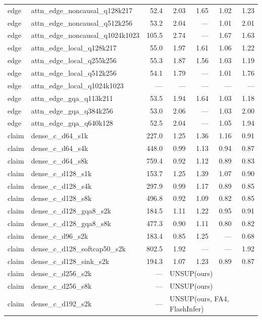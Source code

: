 \begin{longtable}{@{}llrrrrr@{}}
edge & attn\_edge\_noncausal\_q128k217 & 52.4 & 2.03 & 1.65 & 1.02 & 1.23 \\
edge & attn\_edge\_noncausal\_q512k256 & 53.2 & 2.04 & --- & 1.01 & 2.01 \\
edge & attn\_edge\_noncausal\_q1024k1023 & 105.5 & 2.74 & --- & 1.67 & 1.63 \\
edge & attn\_edge\_local\_q128k217 & 55.0 & 1.97 & 1.61 & 1.06 & 1.22 \\
edge & attn\_edge\_local\_q255k256 & 55.3 & 1.87 & 1.56 & 1.03 & 1.19 \\
edge & attn\_edge\_local\_q512k256 & 54.1 & 1.79 & --- & 1.01 & 1.76 \\
edge & attn\_edge\_local\_q1024k1023 & --- & --- & --- & --- & --- \\
edge & attn\_edge\_gqa\_q113k211 & 53.5 & 1.94 & 1.64 & 1.03 & 1.18 \\
edge & attn\_edge\_gqa\_q384k256 & 53.0 & 2.06 & --- & 1.03 & 2.00 \\
edge & attn\_edge\_gqa\_q640k128 & 52.5 & 2.04 & --- & 1.05 & 1.94 \\
claim & dense\_c\_d64\_s1k & 227.0 & 1.25 & 1.36 & 1.16 & 0.91 \\
claim & dense\_c\_d64\_s4k & 448.0 & 0.99 & 1.13 & 0.94 & 0.87 \\
claim & dense\_c\_d64\_s8k & 759.4 & 0.92 & 1.12 & 0.89 & 0.83 \\
claim & dense\_c\_d128\_s1k & 153.7 & 1.25 & 1.39 & 1.07 & 0.90 \\
claim & dense\_c\_d128\_s4k & 297.9 & 0.99 & 1.17 & 0.89 & 0.85 \\
claim & dense\_c\_d128\_s8k & 496.8 & 0.92 & 1.09 & 0.82 & 0.85 \\
claim & dense\_c\_d128\_gqa8\_s2k & 184.5 & 1.11 & 1.22 & 0.95 & 0.91 \\
claim & dense\_c\_d128\_gqa8\_s8k & 477.3 & 0.90 & 1.11 & 0.80 & 0.82 \\
claim & dense\_c\_d96\_s2k & 183.4 & 0.85 & 1.25 & --- & 0.68 \\
claim & dense\_c\_d128\_softcap50\_s2k & 802.5 & 1.92 & --- & --- & 1.92 \\
claim & dense\_c\_d128\_sink\_s2k & 194.3 & 1.07 & 1.23 & 0.89 & 0.87 \\
claim & dense\_c\_d256\_s2k & --- & \multicolumn{4}{l}{UNSUP({ours})} \\
claim & dense\_c\_d256\_s8k & --- & \multicolumn{4}{l}{UNSUP({ours})} \\
claim & dense\_c\_d192\_s2k & --- & \multicolumn{4}{l}{UNSUP({ours, FA4, FlashInfer})} \\

\end{longtable}
